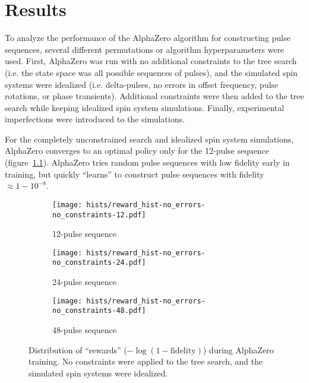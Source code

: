 \chapter{Results}

To analyze the performance of the AlphaZero algorithm for constructing pulse sequences, several different permutations or algorithm hyperparameters were used. First, AlphaZero was run with no additional constraints to the tree search (i.e. the state space was all possible sequences of pulses), and the simulated spin systems were idealized (i.e. delta-pulses, no errors in offset frequency, pulse rotations, or phase transients). Additional constraints were then added to the tree search while keeping idealized spin system simulations. Finally, experimental imperfections were introduced to the simulations.

For the completely unconstrained search and idealized spin system simulations, AlphaZero converges to an optimal
policy only for the 12-pulse sequence (figure~\ref{fig:reward_hist-no_errors-no_constraints-12}). AlphaZero tries random pulse sequences with low fidelity early in training, but quickly ``learns'' to construct pulse sequences with fidelity $\approx 1 - 10^{-8}$.

\begin{figure}[H]
    \centering
    \begin{subfigure}{.49\textwidth}
        \centering
        \texttt{[image: hists/reward\_hist-no\_errors-no\_constraints-12.pdf]}
        \caption{12-pulse sequence}
        \label{fig:reward_hist-no_errors-no_constraints-12}
    \end{subfigure}
    \begin{subfigure}{.49\textwidth}
        \centering
        \texttt{[image: hists/reward\_hist-no\_errors-no\_constraints-24.pdf]}
        \caption{24-pulse sequence}
        \label{fig:reward_hist-no_errors-no_constraints-24}
    \end{subfigure}
    \begin{subfigure}{.49\textwidth}
        \centering
        \texttt{[image: hists/reward\_hist-no\_errors-no\_constraints-48.pdf]}
        \caption{48-pulse sequence}
        \label{fig:reward_hist-no_errors-no_constraints-48}
    \end{subfigure}
    \caption{Distribution of ``rewards'' ($-\log(1 - \text{fidelity})$) during AlphaZero training. No constraints were applied to the tree search, and the simulated spin systems were idealized.}
    \label{fig:reward_hist-no_errors-no_constraints}
\end{figure}

